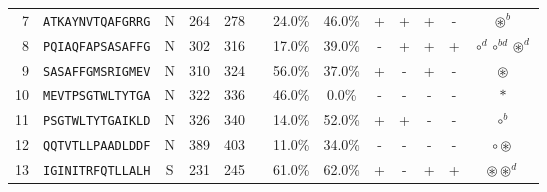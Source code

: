 \begin{tabular}{rcccccccccccc}
7  &  \texttt{ATKAYNVTQAFGRRG} &       N &    264 &   278 &                                                                  &                          24.0\% &                           46.0\% &          + &           + &          + &           - &                                                                                     $ \circledast^b $ \\
8  &  \texttt{PQIAQFAPSASAFFG} &       N &    302 &   316 &                                                                  &                          17.0\% &                           39.0\% &          - &           + &          + &           + &                                                                  $ \circ^d \circ^{bd} \circledast^d $ \\
9  &  \texttt{SASAFFGMSRIGMEV} &       N &    310 &   324 &                                                                  &                          56.0\% &                           37.0\% &          + &           - &          + &           - &                                                                                       $ \circledast $ \\
10 &  \texttt{MEVTPSGTWLTYTGA} &       N &    322 &   336 &                                                                  &                          46.0\% &                            0.0\% &          - &           - &          - &           - &                                                                                              $ \ast $ \\
11 &  \texttt{PSGTWLTYTGAIKLD} &       N &    326 &   340 &                                                                  &                          14.0\% &                           52.0\% &          + &           + &          - &           - &                                                                                           $ \circ^b $ \\
12 &  \texttt{QQTVTLLPAADLDDF} &       N &    389 &   403 &                                                                  &                          11.0\% &                           34.0\% &          - &           - &          - &           - &                                                                                 $ \circ \circledast $ \\
13 &  \texttt{IGINITRFQTLLALH} &       S &    231 &   245 &                                                                  &                          61.0\% &                           62.0\% &          + &           - &          + &           + &                                                                         $ \circledast \circledast^d $ \\

\end{tabular}
